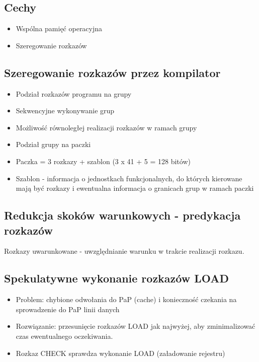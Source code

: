 	\subsection{Cechy}
		\begin{itemize}
			\item Wspólna pamięć operacyjna
			\item Szeregowanie rozkazów
		\end{itemize}
	\subsection{Szeregowanie rozkazów przez kompilator}
		\begin{itemize}
			\item Podział rozkazów programu na grupy
			\item Sekwencyjne wykonywanie grup
			\item Możliwość równoległej realizacji rozkazów w ramach grupy
			\item Podział grupy na paczki
			\item Paczka = 3 rozkazy + szablon (3 x 41 + 5 = 128 bitów)
			\item Szablon - informacja o jednostkach funkcjonalnych, do których kierowane mają być rozkazy i ewentualna informacja o granicach grup w ramach paczki
		\end{itemize}
	\subsection{Redukcja skoków warunkowych - predykacja rozkazów}
		Rozkazy uwarunkowane - uwzględnianie warunku w trakcie realizacji rozkazu.
	\subsection{Spekulatywne wykonanie rozkazów LOAD}
		\begin{itemize}
			\item Problem: chybione odwołania do PaP (cache) i konieczność czekania na sprowadzenie do PaP linii danych
			\item Rozwiązanie: przesunięcie rozkazów LOAD jak najwyżej, aby zminimalizować czas ewentualnego oczekiwania.
			\item Rozkaz CHECK sprawdza wykonanie LOAD (załadowanie rejestru)
		\end{itemize}
	
